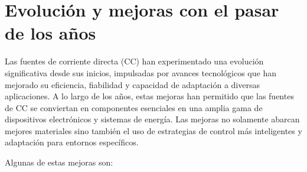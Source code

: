 \section{Evolución y mejoras con el pasar de los años}\par 
Las fuentes de corriente directa (CC) han experimentado una evolución significativa desde sus inicios, impulsadas por avances tecnológicos que han mejorado su eficiencia, fiabilidad y capacidad de adaptación a diversas aplicaciones. A lo largo de los años, estas mejoras han permitido que las fuentes de CC se conviertan en componentes esenciales en una amplia gama de dispositivos electrónicos y sistemas de energía. Las mejoras no solamente abarcan mejores materiales sino también el uso de estrategias de control más inteligentes y adaptación para entornos específicos.\par 
Algunas de estas mejoras son:
